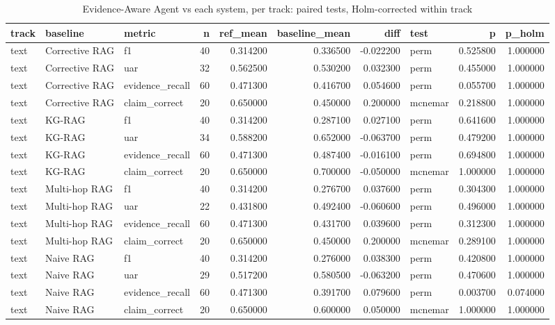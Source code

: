 \begin{table}
\caption{Evidence-Aware Agent vs each system, per track: paired tests, Holm-corrected within track}
\label{tab:table_significance}
\begin{tabular}{lllrrrrlrr}
\toprule
track & baseline & metric & n & ref\_mean & baseline\_mean & diff & test & p & p\_holm \\
\midrule
text & Corrective RAG & f1 & 40 & 0.314200 & 0.336500 & -0.022200 & perm & 0.525800 & 1.000000 \\
text & Corrective RAG & uar & 32 & 0.562500 & 0.530200 & 0.032300 & perm & 0.455000 & 1.000000 \\
text & Corrective RAG & evidence\_recall & 60 & 0.471300 & 0.416700 & 0.054600 & perm & 0.055700 & 1.000000 \\
text & Corrective RAG & claim\_correct & 20 & 0.650000 & 0.450000 & 0.200000 & mcnemar & 0.218800 & 1.000000 \\
text & KG-RAG & f1 & 40 & 0.314200 & 0.287100 & 0.027100 & perm & 0.641600 & 1.000000 \\
text & KG-RAG & uar & 34 & 0.588200 & 0.652000 & -0.063700 & perm & 0.479200 & 1.000000 \\
text & KG-RAG & evidence\_recall & 60 & 0.471300 & 0.487400 & -0.016100 & perm & 0.694800 & 1.000000 \\
text & KG-RAG & claim\_correct & 20 & 0.650000 & 0.700000 & -0.050000 & mcnemar & 1.000000 & 1.000000 \\
text & Multi-hop RAG & f1 & 40 & 0.314200 & 0.276700 & 0.037600 & perm & 0.304300 & 1.000000 \\
text & Multi-hop RAG & uar & 22 & 0.431800 & 0.492400 & -0.060600 & perm & 0.496000 & 1.000000 \\
text & Multi-hop RAG & evidence\_recall & 60 & 0.471300 & 0.431700 & 0.039600 & perm & 0.312300 & 1.000000 \\
text & Multi-hop RAG & claim\_correct & 20 & 0.650000 & 0.450000 & 0.200000 & mcnemar & 0.289100 & 1.000000 \\
text & Naive RAG & f1 & 40 & 0.314200 & 0.276000 & 0.038300 & perm & 0.420800 & 1.000000 \\
text & Naive RAG & uar & 29 & 0.517200 & 0.580500 & -0.063200 & perm & 0.470600 & 1.000000 \\
text & Naive RAG & evidence\_recall & 60 & 0.471300 & 0.391700 & 0.079600 & perm & 0.003700 & 0.074000 \\
text & Naive RAG & claim\_correct & 20 & 0.650000 & 0.600000 & 0.050000 & mcnemar & 1.000000 & 1.000000 \\

\end{tabular}
\end{table}
